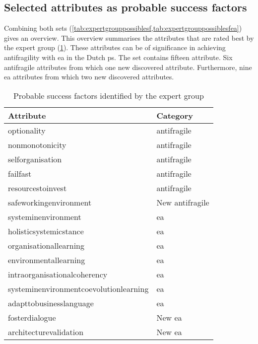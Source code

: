 \subsection{Selected attributes as probable success factors}
\label{sub:validationselectedattributesassf}
Combining both sets (\cref{tab:expertgrouppossiblesf,tab:expertgrouppossiblesfea}) gives an overview. This overview summarises the \glspl{attribute} that are rated best by the expert group (\cref{tab:expertgroupp2ossiblesf}). These \glspl{attribute} can be of significance in achieving \gls{antifragility} with \gls{ea} in the Dutch \gls{ps}. The set contains fifteen \gls{attribute}. Six \gls{antifragile} \glspl{attribute} from which one new discovered \gls{attribute}. Furthermore, nine \gls{ea} \glspl{attribute} from which two new discovered \glspl{attribute}.
\begin{table}[H]
	\centering
		\begin{tabular}{@{}ll@{}}
				\toprule
				\textbf{Attribute} & \textbf{Category}  \\%
				\midrule
				\Gls{optionality} & \Gls{antifragile} \\%
				\Gls{nonmonotonicity} & \Gls{antifragile} \\%
				\Gls{selforganisation} & \Gls{antifragile} \\%
				\Gls{failfast} & \Gls{antifragile} \\%
				\Gls{resourcestoinvest} & \Gls{antifragile} \\%
				\Gls{safeworkingenvironment} & New \Gls{antifragile} \\%
				\Gls{systeminenvironment} & \gls{ea} \\%
				\Gls{holisticsystemicstance} & \gls{ea} \\%
				\Gls{organisationallearning} & \gls{ea} \\%
				\Gls{environmentallearning} & \gls{ea} \\%
				\Gls{intraorganisationalcoherency} & \gls{ea} \\%
				\Gls{systeminenvironmentcoevolutionlearning} & \gls{ea} \\%
				\Gls{adapttobusinesslanguage} & \gls{ea} \\%
				\Gls{fosterdialogue} & New \gls{ea} \\%
				\Gls{architecturevalidation} & New \gls{ea} \\%
				\bottomrule
			\end{tabular}%
		\caption[Probable success factors identified by the expert group]{Probable success factors identified by the expert group}
		\label{tab:expertgroupp2ossiblesf}%
	\end{table}%
